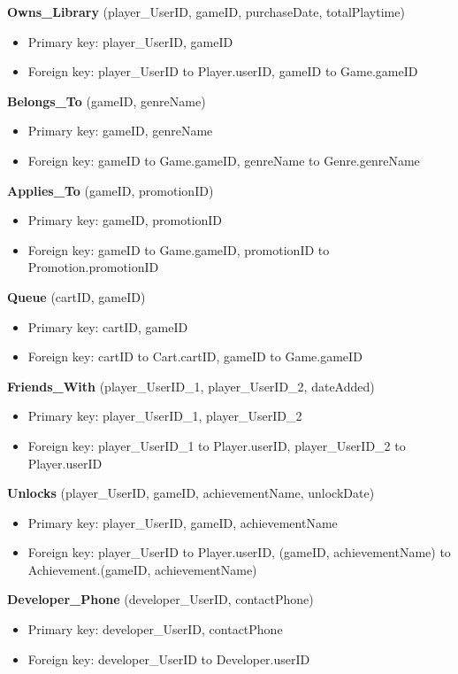 \noindent\textbf{Owns\_Library} (player\_UserID, gameID, purchaseDate, totalPlaytime)
\begin{itemize}[label=-]
    \item Primary key: player\_UserID, gameID
    \item Foreign key: player\_UserID to Player.userID, gameID to Game.gameID
\end{itemize}

\noindent\textbf{Belongs\_To} (gameID, genreName)
\begin{itemize}[label=-]
    \item Primary key: gameID, genreName
    \item Foreign key: gameID to Game.gameID, genreName to Genre.genreName
\end{itemize}

\noindent\textbf{Applies\_To} (gameID, promotionID)
\begin{itemize}[label=-]
    \item Primary key: gameID, promotionID
    \item Foreign key: gameID to Game.gameID, promotionID to Promotion.promotionID
\end{itemize}

\noindent\textbf{Queue} (cartID, gameID)
\begin{itemize}[label=-]
    \item Primary key: cartID, gameID
    \item Foreign key: cartID to Cart.cartID, gameID to Game.gameID
\end{itemize}

\noindent\textbf{Friends\_With} (player\_UserID\_1, player\_UserID\_2, dateAdded)
\begin{itemize}[label=-]
    \item Primary key: player\_UserID\_1, player\_UserID\_2
    \item Foreign key: player\_UserID\_1 to Player.userID, player\_UserID\_2 to Player.userID
\end{itemize}

\noindent\textbf{Unlocks} (player\_UserID, gameID, achievementName, unlockDate)
\begin{itemize}[label=-]
    \item Primary key: player\_UserID, gameID, achievementName
    \item Foreign key: player\_UserID to Player.userID, (gameID, achievementName) to Achievement.(gameID, achievementName)
\end{itemize}


\noindent\textbf{Developer\_Phone} (developer\_UserID, contactPhone)
\begin{itemize}[label=-]
    \item Primary key: developer\_UserID, contactPhone
    \item Foreign key: developer\_UserID to Developer.userID
\end{itemize}